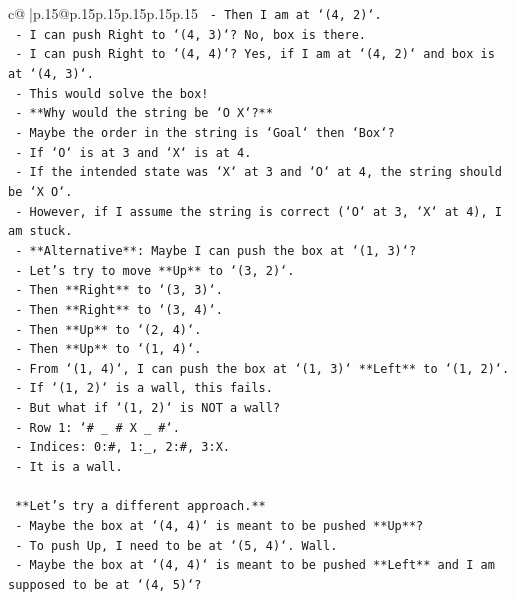 \documentclass{article}
\begin{document}
{\begin{supertabular}{c@{$\;$}|p{.15\linewidth}@{}p{.15\linewidth}p{.15\linewidth}p{.15\linewidth}p{.15\linewidth}p{.15\linewidth}}
{{{\texttt{    {-}   Then I am at `(4, 2)`.} \\
\texttt{    {-}   I can push Right to `(4, 3)`? No, box is there.} \\
\texttt{    {-}   I can push Right to `(4, 4)`? Yes, if I am at `(4, 2)` and box is at `(4, 3)`.} \\
\texttt{    {-}   This would solve the box!} \\
\texttt{    {-}   **Why would the string be `O X`?**} \\
\texttt{    {-}   Maybe the order in the string is `Goal` then `Box`?} \\
\texttt{    {-}   If `O` is at 3 and `X` is at 4.} \\
\texttt{    {-}   If the intended state was `X` at 3 and `O` at 4, the string should be `X O`.} \\
\texttt{    {-}   However, if I assume the string is correct (`O` at 3, `X` at 4), I am stuck.} \\
\texttt{    {-}   **Alternative**: Maybe I can push the box at `(1, 3)`?} \\
\texttt{    {-}   Let's try to move **Up** to `(3, 2)`.} \\
\texttt{    {-}   Then **Right** to `(3, 3)`.} \\
\texttt{    {-}   Then **Right** to `(3, 4)`.} \\
\texttt{    {-}   Then **Up** to `(2, 4)`.} \\
\texttt{    {-}   Then **Up** to `(1, 4)`.} \\
\texttt{    {-}   From `(1, 4)`, I can push the box at `(1, 3)` **Left** to `(1, 2)`.} \\
\texttt{    {-}   If `(1, 2)` is a wall, this fails.} \\
\texttt{    {-}   But what if `(1, 2)` is NOT a wall?} \\
\texttt{    {-}   Row 1: `\# \_ \# X \_ \#`.} \\
\texttt{    {-}   Indices: 0:\#, 1:\_, 2:\#, 3:X.} \\
\texttt{    {-}   It is a wall.} \\
\\ 
\texttt{    **Let's try a different approach.**} \\
\texttt{    {-}   Maybe the box at `(4, 4)` is meant to be pushed **Up**?} \\
\texttt{    {-}   To push Up, I need to be at `(5, 4)`. Wall.} \\
\texttt{    {-}   Maybe the box at `(4, 4)` is meant to be pushed **Left** and I am supposed to be at `(4, 5)`?} \\
}}}
\end{supertabular}}
\end{document}
